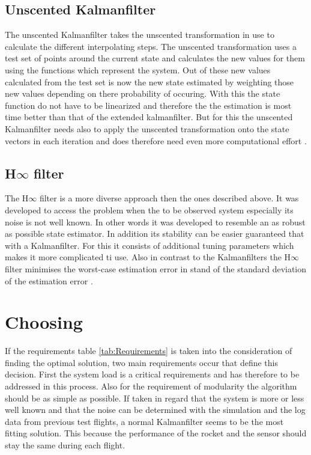   \subsection{Unscented Kalmanfilter}
  The unscented Kalmanfilter takes the unscented transformation in use to calculate the different interpolating steps.
  The unscented transformation uses a test set of points around the current state and calculates the new values for them using the functions which represent the system.
  Out of these new values calculated from the test set is now the new state estimated by weighting those new values depending on there probability of occuring. 
  With this the state function do not have to be linearized and therefore the the estimation is most time better than that of the extended kalmanfilter.
  But for this the unscented Kalmanfilter needs also to apply the unscented transformation onto the state vectors in each iteration
  and does therefore need even more computational effort \cite{SimonDan2006Ose:}.
  
  \subsection{H$\infty$ filter}
  The H$\infty$ filter is a more diverse approach then the ones described above.
  It was developed to access the problem when the to be observed system especially its noise is not well known.
  In other words it was developed to resemble an as robust as possible state estimator.
  In addition its stability can be easier guaranteed that with a Kalmanfilter.
  For this it consists of additional tuning parameters which makes it more complicated ti use.
  Also in contrast to the Kalmanfilters the H$\infty$ filter minimises the worst-case estimation error 
  in stand of the standard deviation of the estimation error \cite{SimonDan2006Ose:}.
  
  \newpage
  \section{Choosing}
  If the requirements table \ref{tab:Requirements} is taken into the consideration of finding
  the optimal solution, two main requirements occur that define this decision.
  First the system load is a critical requirements and has therefore to be addressed in this process.
  Also for the requirement of modularity the algorithm should be as simple as possible.
  If taken in regard that the system is more or less well known and that the noise can be
  determined with the simulation and the log data from previous test flights,
  a normal Kalmanfilter seems to be the most fitting solution.
  This because the performance of the rocket and the sensor should stay the same during
  each flight. 
  
